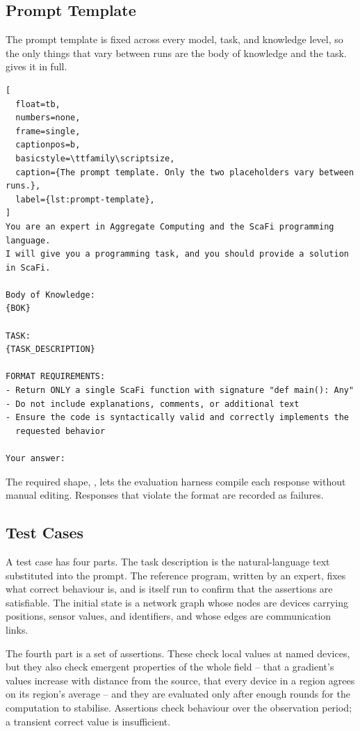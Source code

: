 \subsection{Prompt Template}
\label{subsec:llm-prompt}

The prompt template is fixed across every model, task, and knowledge level,
so the only things that vary between runs are the body of knowledge and the task.
%
 gives it in full.

\begin{lstlisting}[
  float=tb,
  numbers=none,
  frame=single,
  captionpos=b,
  basicstyle=\ttfamily\scriptsize,
  caption={The prompt template. Only the two placeholders vary between runs.},
  label={lst:prompt-template},
]
You are an expert in Aggregate Computing and the ScaFi programming language.
I will give you a programming task, and you should provide a solution in ScaFi.

Body of Knowledge:
{BOK}

TASK:
{TASK_DESCRIPTION}

FORMAT REQUIREMENTS:
- Return ONLY a single ScaFi function with signature "def main(): Any"
- Do not include explanations, comments, or additional text
- Ensure the code is syntactically valid and correctly implements the
  requested behavior

Your answer:
\end{lstlisting}

The required shape, \;, lets the evaluation harness compile each response without manual editing.
Responses that violate the format are recorded as failures.

\subsection{Test Cases}
\label{subsec:llm-test-cases}

A test case has four parts.
%
The task description is the natural-language text substituted into the prompt.
%
The reference program, written by an expert, fixes what correct behaviour is, and is itself run to confirm that the assertions are satisfiable.
%
The initial state is a network graph whose nodes are devices carrying positions, sensor values, and identifiers, and whose edges are communication links.

The fourth part is a set of assertions.
These check local values at named devices,
but they also check emergent properties of the whole field --
that a gradient's values increase with distance from the source, that every device in a region agrees on its region's average --
and they are evaluated only after enough rounds for the computation to stabilise.
%
Assertions check behaviour over the observation period; a transient correct value is insufficient.

